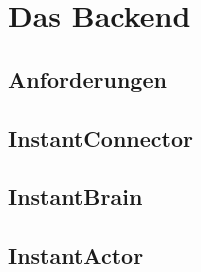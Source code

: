 \chapter{Das Backend}

\section{Anforderungen}
\section{InstantConnector}
\section{InstantBrain}
\section{InstantActor}
